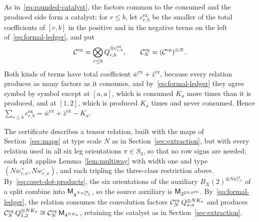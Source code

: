 As in~\eqref{eq:rounded-catalyst}, the factors common to the consumed
and the produced side form a catalyst: for \(r\le b\), let
\(c^{\mathrm{ex}}_{r,b}\) be the smaller of the total coefficients of
\([r,b]\) in the positive and in the negative terms on the left
of~\eqref{eq:formal-ledger}, and put
\begin{equation}\label{eq:catalyst}
 \mathcal C^{\mathrm{ex}}=\bigotimes_{r\le b}Q_{r,b}^{\otimes c^{\mathrm{ex}}_{r,b}},
 \qquad
 \mathcal C^{\mathrm{ex}}_N=(\mathcal C^{\mathrm{ex}})^{\otimes N}.
\end{equation}
Both kinds of terms have total coefficient
\(\bar w^{\mathrm{ex}}+\bar z^{\mathrm{ex}}\), because every relation
produces as many factors as it consumes, and by~\eqref{eq:formal-ledger}
they agree symbol by symbol except at \([a,a]\), which is consumed
\(K_a\) more times than it is produced, and at \([1,2]\), which is
produced \(K_a\) times and never consumed. Hence
\(\sum_{r\le b}c^{\mathrm{ex}}_{r,b}=\bar w^{\mathrm{ex}}
+\bar z^{\mathrm{ex}}-K_a\).

The certificate describes a tensor relation, built with the maps of
Section~\ref{sec:maps} at type scale \(N\) as in
Section~\ref{sec:extraction}, but with every relation used in all six
leg orientations \(\pi\in S_3\), so that no row signs are needed; each
split applies Lemma~\ref{lem:multiway} with width one and type
\((Nw^+_{r,x},Nw^-_{r,x})\), and each tripling the three-class
restriction above. By~\eqref{eq:coset-dot-products}, the six orientations
of the auxiliary \(B_X(2)^{\otimes Nw^{\mathrm{ex}}_{r,x}}\) of a split
combine into \(\mathsf M_{4^{Nw^{\mathrm{ex}}_{r,x}}}\), so the source auxiliary
is \(\mathsf M_{2^{2N\bar w^{\mathrm{ex}}}}\). By~\eqref{eq:formal-ledger}, the
relation consumes the convolution factors
\(\mathcal C^{\mathrm{ex}}_N\,Q_{a,a}^{\otimes NK_a}\) and produces
\(\mathcal C^{\mathrm{ex}}_N\,Q_{1,2}^{\otimes NK_a}\cong
\mathcal C^{\mathrm{ex}}_N\,\mathsf M_{4^{NK_a}}\), retaining the catalyst as in
Section~\ref{sec:extraction}.

